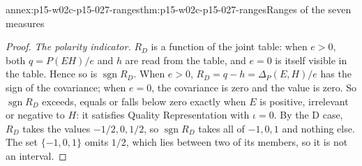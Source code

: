 \begin{annexitem}{annex:p15-w02c-p15-027-ranges}{thm:p15-w02c-p15-027-ranges}{Ranges of the seven measures}
\begin{proof}
\emph{The polarity indicator.} \(R_D\) is a function of the joint table:
when \(e>0\), both \(q=P(EH)/e\) and \(h\) are read from the table, and
\(e=0\) is itself visible in the table. Hence so is
\(\operatorname{sgn}R_D\). When \(e>0\),
\(R_D=q-h=\Delta_P(E,H)/e\) has the sign of the covariance; when
\(e=0\), the covariance is zero and the value is zero. So
\(\operatorname{sgn}R_D\) exceeds, equals or falls below zero exactly
when \(E\) is positive, irrelevant or negative to \(H\): it satisfies
Quality Representation with \(\iota=0\). By the D case, \(R_D\) takes
the values \(-1/2,0,1/2\), so \(\operatorname{sgn}R_D\) takes all of
\(-1,0,1\) and nothing else. The set \(\{-1,0,1\}\) omits \(1/2\),
which lies between two of its members, so it is not an interval.
\end{proof}
\end{annexitem}

